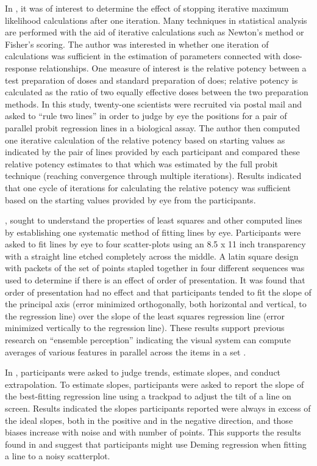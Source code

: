 \documentclass[12pt]{article}
\begin{document}
In \citet{finney1951subjective}, it was of interest to determine the
effect of stopping iterative maximum likelihood calculations after one
iteration. Many techniques in statistical analysis are performed with
the aid of iterative calculations such as Newton's method or Fisher's
scoring. The author was interested in whether one iteration of
calculations was sufficient in the estimation of parameters connected
with dose-response relationships. One measure of interest is the
relative potency between a test preparation of doses and standard
preparation of does; relative potency is calculated as the ratio of two
equally effective doses between the two preparation methods. In this
study, twenty-one scientists were recruited via postal mail and asked to
``rule two lines'' in order to judge by eye the positions for a pair of
parallel probit regression lines in a biological assay. The author then
computed one iterative calculation of the relative potency based on
starting values as indicated by the pair of lines provided by each
participant and compared these relative potency estimates to that which
was estimated by the full probit technique (reaching convergence through
multiple iterations). Results indicated that one cycle of iterations for
calculating the relative potency was sufficient based on the starting
values provided by eye from the participants.

\citet{mosteller1981eye}, sought to understand the properties of least
squares and other computed lines by establishing one systematic method
of fitting lines by eye. Participants were asked to fit lines by eye to
four scatter-plots using an 8.5 x 11 inch transparency with a straight
line etched completely across the middle. A latin square design with
packets of the set of points stapled together in four different
sequences was used to determine if there is an effect of order of
presentation. It was found that order of presentation had no effect and
that participants tended to fit the slope of the principal axis (error
minimized orthogonally, both horizontal and vertical, to the regression
line) over the slope of the least squares regression line (error
minimized vertically to the regression line). These results support
previous research on ``ensemble perception'' indicating the visual
system can compute averages of various features in parallel across the
items in a set
\citep{chong2003representation, chong2005statistical, van2011rapid}.

In \citet{ciccione2021can}, participants were asked to judge trends,
estimate slopes, and conduct extrapolation. To estimate slopes,
participants were asked to report the slope of the best-fitting
regression line using a trackpad to adjust the tilt of a line on screen.
Results indicated the slopes participants reported were always in excess
of the ideal slopes, both in the positive and in the negative direction,
and those biases increase with noise and with number of points. This
supports the results found in \citet{mosteller1981eye} and suggest that
participants might use Deming regression when fitting a line to a noisy
scatterplot.
\end{document}
